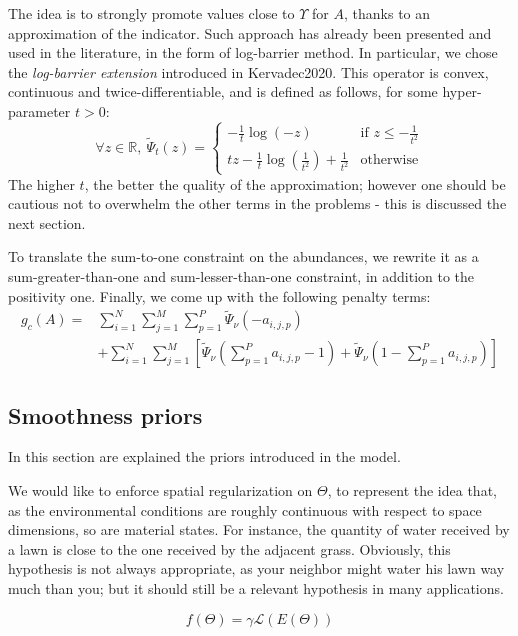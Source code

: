 \documentclass[conference]{IEEEtran}
\begin{document}
The idea is to strongly promote values close to $\Upsilon$ for $A$, thanks to an approximation of the indicator. Such approach has already been presented and used in the literature, in the form of log-barrier method. In particular, we chose the \emph{log-barrier extension} introduced in Kervadec2020. This operator is convex, continuous and twice-differentiable, and is defined as follows, for some hyper-parameter $t > 0$:
$$\forall z\in \mathbb{R},\ \tilde\Psi_t (z) = \begin{cases} - \frac{1}{t} \log (-z) & \text{if } z \leq -\frac{1}{t^2}\\ tz - \frac{1}{t} \log(\frac{1}{t^2}) + \frac{1}{t^2} & \text{otherwise} \end{cases}$$
The higher $t$, the better the quality of the approximation; however one should be cautious not to overwhelm the other terms in the problems - this is discussed the next section.

To translate the sum-to-one constraint on the abundances, we rewrite it as a sum-greater-than-one and sum-lesser-than-one constraint, in addition to the positivity one. Finally, we come up with the following penalty terms:
\begin{equation}\label{eq:g_c}
\begin{split}
  g_c (A) = & \sum_{i = 1}^N \sum_{j = 1}^M \sum_{p=1}^P \tilde\Psi_\nu (-a_{i,j,p})\\
  &+ \sum_{i = 1}^N \sum_{j = 1}^M \left[ \tilde\Psi_\nu(\sum_{p=1}^P a_{i,j,p} - 1) + \tilde\Psi_\nu(1 - \sum_{p=1}^Pa_{i,j,p}) \right]
\end{split}
\end{equation}

\subsection{Smoothness priors}
In this section are explained the priors introduced in the model.

We would like to enforce spatial regularization on $\Theta$, to represent the idea that, as the environmental conditions are roughly continuous with respect to space dimensions, so are material states. For instance, the quantity of water received by a lawn is close to the one received by the adjacent grass. Obviously, this hypothesis is not always appropriate, as your neighbor might water his lawn way much than you; but it should still be a relevant hypothesis in many applications.

\begin{equation}\label{eq:f}
  f(\Theta) = \gamma \mathcal{L}(E(\Theta))
\end{equation}
\end{document}
